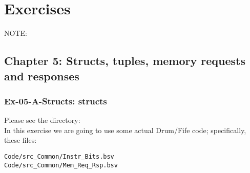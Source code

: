 

\chapter{Exercises}


\setcounter{page}{1}
\renewcommand{\thepage}{\Alph{chapter}-\arabic{page}}

\label{apx_exercises}


NOTE: 

\vspace{5ex}



\hdivider

\section*{Chapter 5: Structs, tuples, memory requests and responses}


\subsection*{Ex-05-A-Structs: structs}

\label{Ex-05-A-Structs}

Please see the directory:  \\
In this exercise we are going to use some actual Drum/Fife code;
specifically, these files:

\begin{tabbing}
\hmmmm \= \verb|Code/src_Common/Instr_Bits.bsv| \\
       \> \verb|Code/src_Common/Mem_Req_Rsp.bsv|
\end{tabbing}

